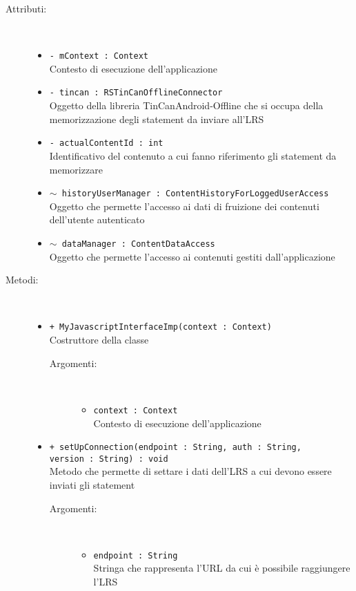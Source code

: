 \documentclass[../Tesi.tex]{subfiles}
\begin{document}
		\begin{description}
			\item[Attributi:] \
			\begin{itemize}
				\item \texttt{- mContext : Context}\\
				Contesto di esecuzione dell'applicazione

				\item \texttt{- tincan : RSTinCanOfflineConnector}\\
				Oggetto della libreria TinCanAndroid-Offline che si occupa della memorizzazione degli statement da inviare all'LRS

				\item \texttt{- actualContentId : int}\\
				Identificativo del contenuto a cui fanno riferimento gli statement da memorizzare

				\item \texttt{$\sim$ historyUserManager : ContentHistoryForLoggedUserAccess}\\
				Oggetto che permette l'accesso ai dati di fruizione dei contenuti dell'utente autenticato

				\item \texttt{$\sim$ dataManager : ContentDataAccess}\\
				Oggetto che permette l'accesso ai contenuti gestiti dall'applicazione
			\end{itemize}

			\item[Metodi:] \
			\begin{itemize}
				\item \texttt{+ MyJavascriptInterfaceImp(context : Context)}\\
				Costruttore della classe 
				\begin{description}
					\item[Argomenti:] \
					\begin{itemize}
						\item \texttt{context : Context}\\
						Contesto di esecuzione dell'applicazione
					\end{itemize}
				\end{description}

				\item \texttt{+ setUpConnection(endpoint : String, auth : String, \\version : String) : void}\\
				Metodo che permette di settare i dati dell'LRS a cui devono essere inviati gli statement
				\begin{description}
					\item[Argomenti:] \
					\begin{itemize}
						\item \texttt{endpoint : String}\\
						Stringa che rappresenta l'URL da cui è possibile raggiungere l'LRS


\end{itemize}
\end{description}
\end{itemize}
\end{description}
\end{document}
